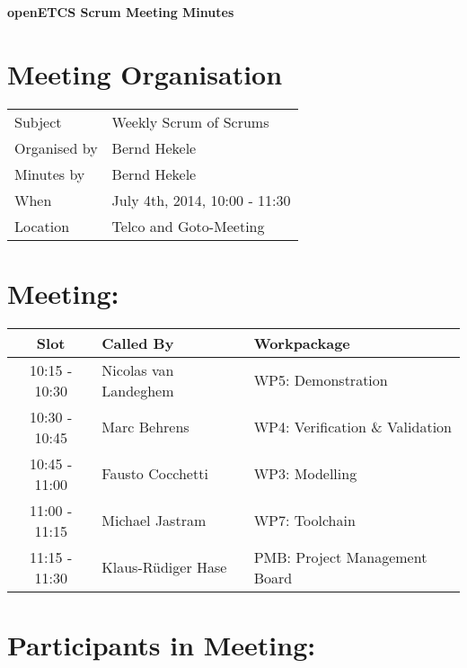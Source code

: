\documentclass[a4paper, 11pt]{article}
\begin{document}
{\begin{center}\huge\bf openETCS Scrum Meeting Minutes\end{center}}
\section{Meeting Organisation}

\renewcommand{\arraystretch}{1.5}
\begin{supertabular}{m{.2\textwidth}m{.8\textwidth}}
Subject & Weekly Scrum of Scrums\\
Organised by & Bernd Hekele\\
Minutes by & Bernd Hekele\\
When & July 4th, 2014, 10:00 - 11:30\\
Location & Telco and Goto-Meeting\\
\end{supertabular}

\renewcommand{\arraystretch}{1.0}
\section{Meeting:}

\begin{tabular}{|c|l|l|}
\hline
\textbf{Slot} &  \textbf{Called By} & \textbf{Workpackage} \\
\hline  
10:15 - 10:30 & Nicolas van Landeghem & WP5: Demonstration \\\hline  
10:30 - 10:45 & Marc Behrens & WP4: Verification \& Validation \\\hline  
10:45 - 11:00 & Fausto Cocchetti & WP3: Modelling \\\hline  
11:00 - 11:15 & Michael Jastram & WP7: Toolchain \\\hline
11:15 - 11:30 & Klaus-R\"udiger Hase & PMB: Project Management Board \\\hline  
\end{tabular}

\section{Participants in Meeting:}
\end{document}
